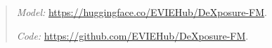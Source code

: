 \documentclass[preprint,12pt]{elsarticle}
\begin{document}
\begin{frontmatter}
\begin{abstract}



\noindent\textit{Model:} \url{https://huggingface.co/EVIEHub/DeXposure-FM}.

\noindent\textit{Code:} \url{https://github.com/EVIEHub/DeXposure-FM}.


\end{abstract}
\end{frontmatter}
\end{document}
